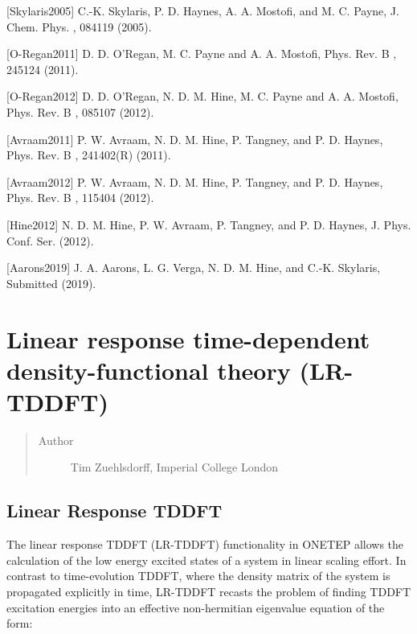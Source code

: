 \documentclass[letterpaper,10pt,english]{sphinxmanual}
\begin{document}
{[}Skylaris2005{]} C.-K. Skylaris, P. D. Haynes, A. A. Mostofi, and M. C. Payne, J. Chem. Phys. , 084119 (2005).

{[}O-Regan2011{]} D. D. O’Regan, M. C. Payne and A. A. Mostofi, Phys. Rev. B , 245124 (2011).

{[}O-Regan2012{]} D. D. O’Regan, N. D. M. Hine, M. C. Payne and A. A. Mostofi, Phys. Rev. B , 085107 (2012).

{[}Avraam2011{]} P. W. Avraam, N. D. M. Hine, P. Tangney, and P. D. Haynes, Phys. Rev. B , 241402(R) (2011).

{[}Avraam2012{]} P. W. Avraam, N. D. M. Hine, P. Tangney, and P. D. Haynes, Phys. Rev. B , 115404 (2012).

{[}Hine2012{]} N. D. M. Hine, P. W. Avraam, P. Tangney, and P. D. Haynes, J. Phys. Conf. Ser. (2012).

{[}Aarons2019{]} J. A. Aarons, L. G. Verga, N. D. M. Hine, and C.-K. Skylaris, Submitted (2019).


\section{Linear response time-dependent density-functional theory (LR-TDDFT)}
\label{\detokenize{lr_tddft::doc}}\label{\detokenize{lr_tddft:linear-response-time-dependent-density-functional-theory-lr-tddft}}\begin{quote}\begin{description}
\item[{Author}] \leavevmode
Tim Zuehlsdorff, Imperial College London

\end{description}\end{quote}


\subsection{Linear Response TDDFT}
\label{\detokenize{lr_tddft:linear-response-tddft}}
The linear response TDDFT (LR-TDDFT) functionality in ONETEP allows the
calculation of the low energy excited states of a system in linear
scaling effort. In contrast to time-evolution TDDFT, where the density
matrix of the system is propagated explicitly in time, LR-TDDFT recasts
the problem of finding TDDFT excitation energies into an effective
non-hermitian eigenvalue equation of the form:
\end{document}
